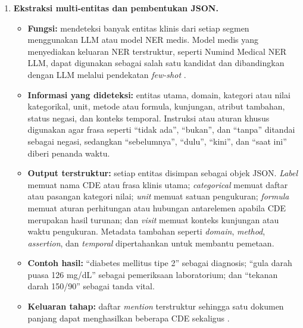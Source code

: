 \begin{enumerate}
    \item \textbf{Ekstraksi multi-entitas dan pembentukan JSON.}
    \begin{itemize}
        \item \textbf{Fungsi:} mendeteksi banyak entitas klinis dari setiap segmen menggunakan LLM atau model NER medis. Model medis yang menyediakan keluaran NER terstruktur, seperti Numind Medical NER LLM, dapat digunakan sebagai salah satu kandidat dan dibandingkan dengan LLM melalui pendekatan \textit{few-shot} \citep{johnsnowlabs2026numind}.
        \item \textbf{Informasi yang dideteksi:} entitas utama, domain, kategori atau nilai kategorikal, unit, metode atau formula, kunjungan, atribut tambahan, status negasi, dan konteks temporal. Instruksi atau aturan khusus digunakan agar frasa seperti ``tidak ada'', ``bukan'', dan ``tanpa'' ditandai sebagai negasi, sedangkan ``sebelumnya'', ``dulu'', ``kini'', dan ``saat ini'' diberi penanda waktu.
        \item \textbf{Output terstruktur:} setiap entitas disimpan sebagai objek JSON. \textit{Label} memuat nama CDE atau frasa klinis utama; \textit{categorical} memuat daftar atau pasangan kategori nilai; \textit{unit} memuat satuan pengukuran; \textit{formula} memuat aturan perhitungan atau hubungan antarelemen apabila CDE merupakan hasil turunan; dan \textit{visit} memuat konteks kunjungan atau waktu pengukuran. Metadata tambahan seperti \textit{domain}, \textit{method}, \textit{assertion}, dan \textit{temporal} dipertahankan untuk membantu pemetaan.
        \item \textbf{Contoh hasil:} ``diabetes mellitus tipe 2'' sebagai diagnosis; ``gula darah puasa 126 mg/dL'' sebagai pemeriksaan laboratorium; dan ``tekanan darah 150/90'' sebagai tanda vital.
        \item \textbf{Keluaran tahap:} daftar \textit{mention} terstruktur sehingga satu dokumen panjang dapat menghasilkan beberapa CDE sekaligus \citep{purwitasari_comparison_2023}.
    \end{itemize}


\end{enumerate}
